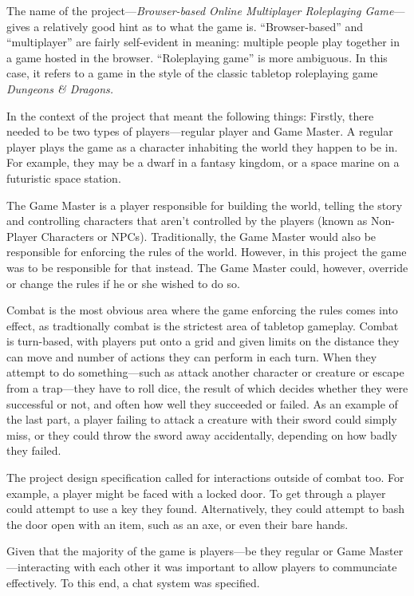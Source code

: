 The name of the project---\textit{Browser-based Online Multiplayer Roleplaying Game}---gives a relatively good hint as to what the game is. ``Browser-based'' and ``multiplayer'' are fairly self-evident in meaning: multiple people play together in a game hosted in the browser. ``Roleplaying game'' is more ambiguous. In this case, it refers to a game in the style of the classic tabletop roleplaying game \textit{Dungeons \& Dragons.}

In the context of the project that meant the following things: Firstly, there needed to be two types of players---regular player and Game Master. A regular player plays the game as a character inhabiting the world they happen to be in. For example, they may be a dwarf in a fantasy kingdom, or a space marine on a futuristic space station.

The Game Master is a player responsible for building the world, telling the story and controlling characters that aren't controlled by the players (known as Non-Player Characters or NPCs). Traditionally, the Game Master would also be responsible for enforcing the rules of the world. However, in this project the game was to be responsible for that instead. The Game Master could, however, override or change the rules if he or she wished to do so.

Combat is the most obvious area where the game enforcing the rules comes into effect, as tradtionally combat is the strictest area of tabletop gameplay. Combat is turn-based, with players put onto a grid and given limits on the distance they can move and number of actions they can perform in each turn. When they attempt to do something---such as attack another character or creature or escape from a trap---they have to roll dice, the result of which decides whether they were successful or not, and often how well they succeeded or failed. As an example of the last part, a player failing to attack a creature with their sword could simply miss, or they could throw the sword away accidentally, depending on how badly they failed.

The project design specification called for interactions outside of combat too. For example, a player might be faced with a locked door. To get through a player could attempt to use a key they found. Alternatively, they could attempt to bash the door open with an item, such as an axe, or even their bare hands.

Given that the majority of the game is players---be they regular or Game Master---interacting with each other it was important to allow players to communciate effectively. To this end, a chat system was specified.

